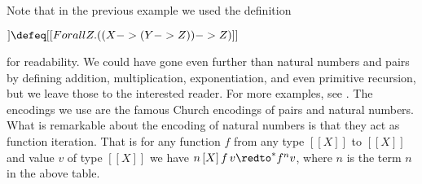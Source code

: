 Note that in the previous example we used the definition 
\begin{center}
  \begin{math}
    [[PAIRTY X Y]] \defeq [[Forall Z.((X -> (Y -> Z)) -> Z)]]
  \end{math}
\end{center}
for readability. We could have gone even further than natural numbers
and pairs by defining
addition, multiplication, exponentiation, and even primitive
recursion, but we leave those to the interested reader.  For more
examples, see \cite{Girard:1989}.  The encodings we use are the famous
Church encodings of pairs and natural numbers.  What is remarkable
about the encoding of natural numbers is that they act as function
iteration.  That is for any function $f$ from any type $[[X]]$ to
$[[X]]$ and value $v$ of type $[[X]]$ we have $n\,[X]\,f\,v \redto^* f^n
v$, where $n$ is the term $n$ in the above table.

